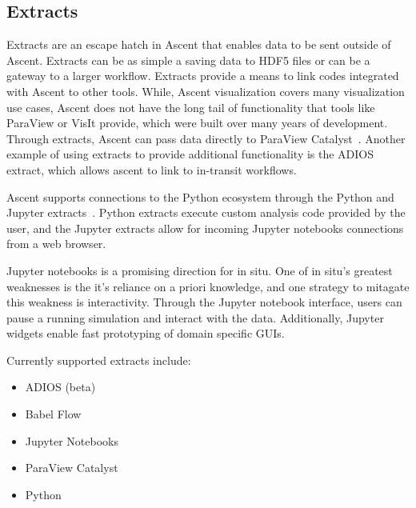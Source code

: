 
\subsection{Extracts}
Extracts are an escape hatch in Ascent that enables data to be sent
outside of Ascent.
%
Extracts can be as simple a saving data to HDF5 files or can be a gateway
to a larger workflow.
Extracts provide a means to link codes integrated with Ascent to other tools.
%
While, Ascent visualization covers many visualization use cases,
Ascent does not have the long tail of functionality that tools like ParaView or VisIt provide, which
were built over many years of development.
%
Through extracts, Ascent can pass data directly to ParaView Catalyst~\cite{Catalyst}.
%
Another example of using extracts to provide additional functionality is the
ADIOS~\cite{Lofstead2008} extract, which allows ascent to link to in-transit workflows.

Ascent supports connections to the Python ecosystem through the Python and
Jupyter extracts~\cite{CyrusISAV,Jupyter}.
%
Python extracts execute custom analysis code provided by the user, and the
Jupyter extracts allow for incoming Jupyter notebooks connections from a web
browser.

Jupyter notebooks is a promising direction for in situ.
%
One of in situ's greatest weaknesses is the it's reliance on a priori
knowledge, and one strategy to mitagate this weakness is interactivity.
%
Through the Jupyter notebook interface, users can pause a running simulation
and interact with the data.
%
Additionally, Jupyter widgets enable fast prototyping of domain specific
GUIs.

Currently supported extracts include:
\begin{itemize}
\item ADIOS (beta)
\item Babel Flow~\cite{babelflow}
\item Jupyter Notebooks
\item ParaView Catalyst
\item Python
\end{itemize}


